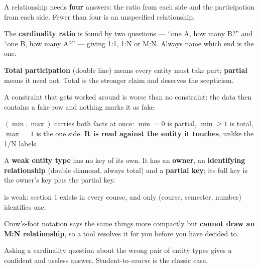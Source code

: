 \begin{chaptersummary}
\begin{tight}
  \item A relationship needs \textbf{four} answers: the ratio from each side
        and the participation from each side. Fewer than four is an
        unspecified relationship.
  \item The \textbf{cardinality ratio} is found by two questions --- ``one A,
        how many B?'' and ``one B, how many A?'' --- giving 1:1, 1:N or M:N.
        Always name which end is the one.
  \item \textbf{Total participation} (double line) means every entity must take
        part; \textbf{partial} means it need not. Total is the stronger claim
        and deserves the scepticism.
  \item A constraint that gets worked around is worse than no constraint: the
        data then contains a fake row and nothing marks it as fake.
  \item $(\min,\max)$ carries both facts at once: $\min=0$ is partial,
        $\min\ge 1$ is total, $\max=1$ is the one side. \textbf{It is read
        against the entity it touches}, unlike the 1/N labels.
  \item A \textbf{weak entity type} has no key of its own. It has an
        \textbf{owner}, an \textbf{identifying relationship} (double diamond,
        always total) and a \textbf{partial key}; its full key is the owner's
        key plus the partial key.
  \item {} is weak: section 1 exists in every course, and only
        (course, semester, number) identifies one.
  \item Crow's-foot notation says the same things more compactly but
        \textbf{cannot draw an M:N relationship}, so a tool resolves it for you
        before you have decided to.
  \item Asking a cardinality question about the wrong pair of entity types
        gives a confident and useless answer. Student-to-\emph{course} is the
        classic case.
\end{tight}
\end{chaptersummary}

